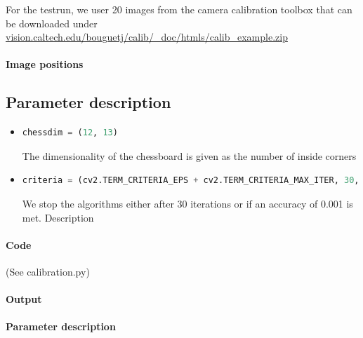 \documentclass{scrartcl}
\begin{document}
For the testrun, we user 20 images from the camera calibration toolbox that can be downloaded under \href{http://www.vision.caltech.edu/bouguetj/calib_doc/htmls/calib_example.zip}{vision.caltech.edu/bouguetj/calib/\_doc/htmls/calib\_example.zip}

\paragraph{Image positions}


\subsection{Parameter description}
\begin{itemize}
\item
\begin{lstlisting}[language=Python]
chessdim = (12, 13)
\end{lstlisting}
The dimensionality of the chessboard is given as the number of inside corners
\item
\begin{lstlisting}[language=Python]
criteria = (cv2.TERM_CRITERIA_EPS + cv2.TERM_CRITERIA_MAX_ITER, 30, 0.001)
\end{lstlisting}
We stop the algorithms either after 30 iterations or if an accuracy of 0.001 is met.
Description
\end{itemize}

\paragraph{Code}
(See calibration.py)


\paragraph{Output}

\paragraph{Parameter description}

\end{document}
